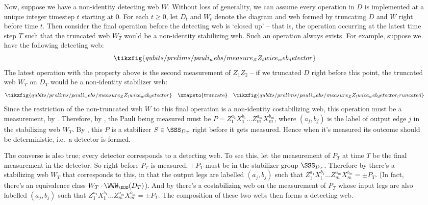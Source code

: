 Now, suppose we have a non-identity detecting web $W$.
Without loss of generality, we can assume every operation in $D$ is implemented at a unique integer timestep $t$ starting at $0$.
For each $t \geq 0$, let $D_t$ and $W_t$ denote the diagram and web formed by truncating $D$ and $W$ right before time $t$.
Then consider the final operation before the detecting web is `closed up' -- that is, the operation occurring at the latest time step $T$ such that the truncated web $W_T$ would be a non-identity stabilizing web.
Such an operation always exists.
For example, suppose we have the following detecting web:
\begin{equation}
    \tikzfig{qubits/prelims/pauli_webs/measure_ZZ_twice_web_detector}
\end{equation}
The latest operation with the property above is the second measurement of $Z_1 Z_2$ -- if we truncated $D$ right before this point, the truncated web $W_T$ on $D_T$ would be a non-identity stabilizer web:
\begin{equation}
    \tikzfig{qubits/prelims/pauli_webs/measure_ZZ_twice_web_detector}
    \quad \xmapsto{\text{truncate}} \quad
    \tikzfig{qubits/prelims/pauli_webs/measure_ZZ_twice_web_detector_truncated}
\end{equation}
Since the restriction of the non-truncated web $W$ to this final operation is a non-identity costabilizing web, this operation must be a measurement, by .
Therefore, by , the Pauli being measured must be $P = Z_1^{a_1} X_1^{b_1} \ldots Z_m^{a_m} X_m^{b_m}$, where $(a_j, b_j)$ is the label of output edge $j$ in the stabilizing web $W_T$.
By , this $P$ is a stabilizer $S \in \SSS_{D_T}$ right before it gets measured.
Hence when it's measured its outcome should be deterministic, i.e.\ a detector is formed.

The converse is also true; every detector corresponds to a detecting web.
To see this, let the measurement of $P_T$ at time $T$ be the final measurement in the detector.
So right before $P_T$ is measured, $\pm P_T$ must be in the stabilizer group $\SSS_{D_T}$.
Therefore by  there's a stabilizing web $W_T$ that corresponds to this, in that the output legs are labelled $(a_j, b_j)$ such that $Z_1^{a_1} X_1^{b_1} \ldots Z_m^{a_m} X_m^{b_m} = \pm P_T$.
(In fact, there's an equivalence class $W_T \cdot \WWW_\DDD(D_T)$).
And by  there's a costabilizing web on the measurement of $P_T$ whose input legs are also labelled $(a_j, b_j)$ such that $Z_1^{a_1} X_1^{b_1} \ldots Z_m^{a_m} X_m^{b_m} = \pm P_T$.
The composition of these two webs then forms a detecting web.

